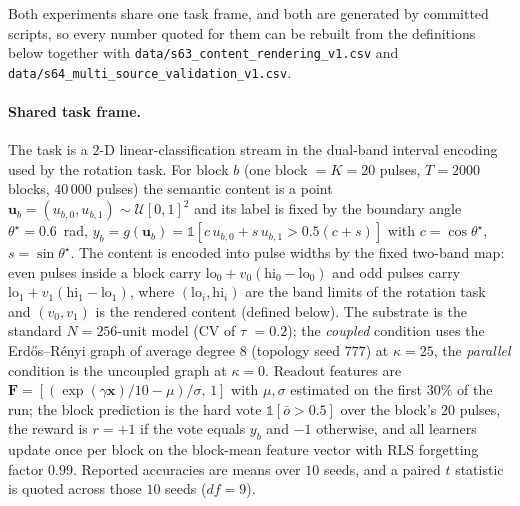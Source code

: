 \documentclass[preprint,12pt]{elsarticle}
\begin{document}
Both experiments share one task frame, and both are generated by committed
scripts, so every number quoted for them can be rebuilt from the definitions
below together with \texttt{data/s63\_content\_rendering\_v1.csv} and
\texttt{data/s64\_multi\_source\_validation\_v1.csv}.

\paragraph{Shared task frame.} The task is a $2$-D linear-classification
stream in the dual-band interval encoding used by the rotation task. For
block $b$ (one block $=K=20$ pulses, $T=2000$ blocks, $40\,000$ pulses) the
semantic content is a point
$\mathbf u_b=(u_{b,0},u_{b,1})\sim\mathcal U[0,1]^2$ and its label is fixed by
the boundary angle $\theta^\star=0.6$~rad,
$y_b=g(\mathbf u_b)=\mathbb 1[c\,u_{b,0}+s\,u_{b,1}>0.5(c+s)]$ with
$c=\cos\theta^\star$, $s=\sin\theta^\star$. The content is encoded into pulse
widths by the fixed two-band map: even pulses inside a block carry
$\mathrm{lo}_0+v_0(\mathrm{hi}_0-\mathrm{lo}_0)$ and odd pulses carry
$\mathrm{lo}_1+v_1(\mathrm{hi}_1-\mathrm{lo}_1)$, where $(\mathrm{lo}_i,
\mathrm{hi}_i)$ are the band limits of the rotation task and $(v_0,v_1)$ is
the rendered content (defined below). The substrate is the standard
$N=256$-unit model (CV of $\tau$ $=0.2$); the \emph{coupled} condition uses
the Erd\H{o}s--R\'enyi graph of average degree $8$ (topology seed $777$) at
$\kappa=25$, the \emph{parallel} condition is the uncoupled graph at
$\kappa=0$. Readout features are
$\mathbf F=[(\exp(\gamma\mathbf x)/10-\mu)/\sigma,\,1]$ with $\mu,\sigma$
estimated on the first $30\%$ of the run; the block prediction is the hard
vote $\mathbb 1[\bar o>0.5]$ over the block's $20$ pulses, the reward is
$r=+1$ if the vote equals $y_b$ and $-1$ otherwise, and all learners update
once per block on the block-mean feature vector with RLS forgetting factor
$0.99$. Reported accuracies are means over $10$ seeds, and a paired $t$
statistic is quoted across those $10$ seeds ($df=9$).
\end{document}
